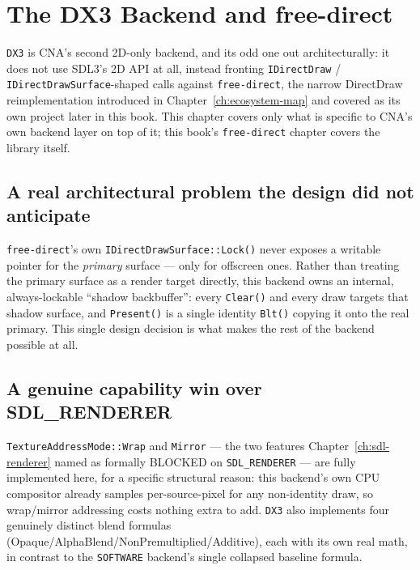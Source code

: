\chapter{The DX3 Backend and free-direct}
\label{ch:dx3-freedirect-backend}

\texttt{DX3} is CNA's second 2D-only backend, and its odd one out architecturally: it does
not use SDL3's 2D API at all, instead fronting \texttt{IDirectDraw} / \texttt{IDirectDrawSurface}-shaped
calls against \texttt{free-direct}, the narrow DirectDraw reimplementation introduced in
Chapter~\ref{ch:ecosystem-map} and covered as its own project later in this book. This chapter
covers only what is specific to CNA's own backend layer on top of it; this book's
\texttt{free-direct} chapter covers the library itself.

\section{A real architectural problem the design did not anticipate}

\texttt{free-direct}'s own \texttt{IDirectDrawSurface::Lock()} never exposes a writable
pointer for the \emph{primary} surface --- only for offscreen ones. Rather than treating the
primary surface as a render target directly, this backend owns an internal, always-lockable
``shadow backbuffer'': every \texttt{Clear()} and every  draw targets
that shadow surface, and \texttt{Present()} is a single identity \texttt{Blt()} copying it
onto the real primary. This single design decision is what makes the rest of the backend
possible at all.

\section{A genuine capability win over SDL\_RENDERER}

\texttt{TextureAddressMode::Wrap} and \texttt{Mirror} --- the two features
Chapter~\ref{ch:sdl-renderer} named as formally BLOCKED on \texttt{SDL\_RENDERER} --- are
fully implemented here, for a specific structural reason: this backend's own CPU compositor
already samples per-source-pixel for any non-identity draw, so wrap/mirror addressing costs
nothing extra to add. \texttt{DX3} also implements four genuinely distinct blend formulas
(Opaque/AlphaBlend/NonPremultiplied/Additive), each with its own real math, in contrast to
the \texttt{SOFTWARE} backend's single collapsed baseline formula.

